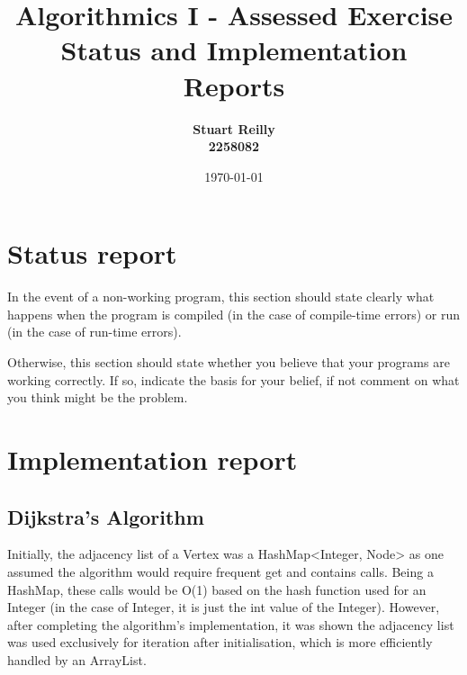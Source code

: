 \documentclass{article}
\title{Algorithmics I - Assessed Exercise\\ \vspace{4mm}
Status and Implementation Reports}
\author{\textbf{Stuart Reilly} \\ \textbf{2258082} }
\date{\today}
\begin{document}
    \maketitle

    \section*{Status report}

    In the event of a non-working program, this section should state clearly what happens when the program is compiled (in the case of compile-time errors) or run (in the case of run-time errors).

    Otherwise, this section should state whether you believe that your programs are working correctly. If so, indicate the basis for your belief, if not comment on what you think might be the problem.

    \section*{Implementation report}

    \subsection*{Dijkstra's Algorithm}

    Initially, the adjacency list of a Vertex was a HashMap<Integer, Node> as one assumed the algorithm would require
    frequent get and contains calls.
    Being a HashMap, these calls would be O(1) based on the hash function used for an Integer (in the case of Integer,
    it is just the int value of the Integer).
    However, after completing the algorithm's implementation, it was shown the adjacency list was used exclusively for
    iteration after initialisation, which is more efficiently handled by an ArrayList.
\end{document}
